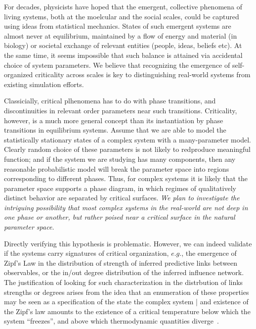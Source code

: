 \documentclass[onecolumn, compsoc,11pt]{IEEEtran}
\begin{document}
For decades, physicists have hoped that the emergent, collective phenomena of living systems, both at the moelcular and the social scales, could be captured using ideas from statistical mechanics. States of such  emergent systems are almost never at equilibrium, maintained by a flow of energy and material (in biology) or societal exchange of relevant entities (people, ideas, beliefs etc). At the same time, it seems impossible that such balance is attained via accidental choice of system parameters. We believe that recognizing the emergence of self-organized criticality across  scales is  key to  distinguishing real-world systems from existing simulation efforts.

Classicially, critical plhenomena has to do with phase transitions, and discontinuities in relevant order parameters near such transitions. 
Criticality, however, is a much more general concept than its instantiation by phase transitions in equilibrium systems. Assume that we are able to model the statistically stationary states of a complex system  with a many-parameter model. Clearly random choice of these parameters is not likely to redproduce meaningful function; and  if the system we are studying has many components, then any reasonable probabilistic model will break the parameter space into regions corresponding to different phases. Thus, for complex systems it is likely that the parameter space supports a phase diagram, in which regimes of qualitatively distinct behavior are separated  by critical surfaces. \textit{We plan to investigate the  intriguing possibility  that most complex systems in the real-world are not deep in one phase or another, but rather poised near a critical surface in the natural parameter space.} 

\def\q{\sigma}

Directly verifying this hypothesis is problematic. However, we can indeed validate if the systems carry signatures of critical organization, $e.g.$, the emergence of Zipf's Law in the distribution of
strength of inferred predictive links between observables, or the in/out degree distribution of the inferred influence network.
The justification of looking for such characterization in the distrbution of links strengths or degrees  arises from the idea that an enumeration of these properties may be seen as a specification of the state  the complex system | and  existence of the Zipf's law amounts to the existence of a critical temperature below which the system ``freezes'', and above which thermodynamic quantities diverge~\cite{mora2011biological}.
\end{document}
